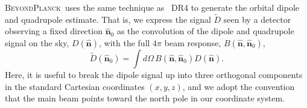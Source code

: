 \documentclass[twocolumn]{aa}
\newcommand{\BP}{\textsc{BeyondPlanck}}
\begin{document}
\BP\ uses the same technique as \Planck\ DR4 \citep[see appendix C]{npipe} to generate the orbital dipole and quadrupole estimate. That is, we express the signal $\tilde{D}$ seen by a detector observing a fixed direction $\hat{\boldsymbol n}_0$ as the convolution of the dipole and quadrupole signal on the sky, $D(\hat{\boldsymbol n})$, with the full $4\pi$ beam response, $B(\hat{\boldsymbol n}, \hat{\boldsymbol n}_0)$,
\begin{equation}
\tilde{D}(\hat{\boldsymbol n}_0) = \int d\Omega\, B(\hat{\boldsymbol n}, \hat{\boldsymbol n}_0) D(\hat{\boldsymbol n}).
\end{equation}
Here, it is useful to break the dipole signal up into three orthogonal components in the standard Cartesian coordinates $(x,y,z)$, and we adopt the convention that the main beam points toward the north pole in our coordinate system.
\end{document}
